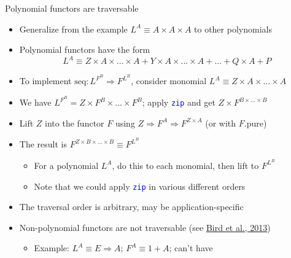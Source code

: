 \documentclass[english]{beamer}
\begin{document}
\begin{frame}{Polynomial functors are traversable}
\begin{itemize}
\item \vspace{-0.1cm}Generalize from the example $L^{A}\equiv A\times A\times A$
to other polynomials
\item Polynomial functors have the form {\small{}
\[
L^{A}\equiv Z\times A\times...\times A+Y\times A\times...\times A+...+Q\times A+P
\]
}{\small\par}
\item To implement {\small{}$\text{seq}:L^{F^{B}}\Rightarrow F^{L^{B}}$},
consider monomial {\small{}$L^{A}\equiv Z\times A\times...\times A$}{\small\par}
\item We have $L^{F^{B}}=Z\times F^{B}\times...\times F^{B}$; apply \texttt{\textcolor{blue}{\footnotesize{}zip}}
and get $Z\times F^{B\times...\times B}$ 
\item Lift $Z$ into the functor $F$ using $Z\Rightarrow F^{A}\Rightarrow F^{Z\times A}$
(or with $F.\text{pure}$)
\item The result is $F^{Z\times B\times...\times B}\equiv F^{L^{B}}$
\begin{itemize}
\item For a polynomial $L^{A}$, do this to each monomial, then lift to
$F^{L^{B}}$
\item Note that we could apply \texttt{\textcolor{blue}{\footnotesize{}zip}}
in various different orders
\end{itemize}
\item The traversal order is arbitrary, may be application-specific
\item Non-polynomial functors are not traversable (see \href{http://www.cs.ox.ac.uk/jeremy.gibbons/publications/uitbaf.pdf}{Bird et al., 2013})
\begin{itemize}
\item Example: $L^{A}\equiv E\Rightarrow A$; $F^{A}\equiv1+A$; can't have

\end{itemize}
\end{itemize}
\end{frame}
\end{document}
